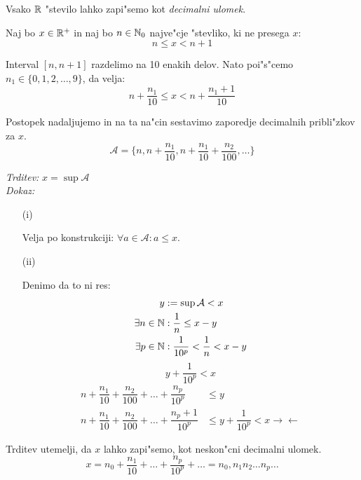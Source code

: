 Vsako $\mathbb{R}$ "stevilo lahko zapi"semo kot \emph{decimalni ulomek}.

Naj bo $x \in \mathbb{R}^+$ in naj bo $n \in \mathbb{N}_0$ najve"cje "stevliko, ki ne presega $x$:
\begin{equation*}
n \leq x < n + 1
\end{equation*}

Interval $[n, n+1]$ razdelimo na 10 enakih delov. Nato poi"s"cemo $n_1 \in \{0, 1, 2, \ldots, 9\}$, da velja:
\begin{equation*}
n + \frac{n_1}{10} \leq x <  n + \frac{n_1 + 1}{10}
\end{equation*}

Postopek nadaljujemo in na ta na"cin sestavimo zaporedje decimalnih pribli"zkov za $x$.
\begin{equation*}
\mathcal{A} = \{n, n + \frac{n_1}{10}, n + \frac{n_1}{10} + \frac{n_2}{100}, \ldots\}
\end{equation*}

\emph{Trditev:} $x = \sup \mathcal{A}$\\
\emph{Dokaz:}
\begin{enumerate}
	\item[(i)] 
	
	Velja po konstrukciji: $\forall a \in \mathcal{A}: a \leq x$.
	
	\item[(ii)] 
	
	Denimo da to ni res:
	\begin{align*}
	y &:= \sup \mathcal{A} < x\\
	\exists n \in \mathbb{N}&: \frac{1}{n} \leq x - y\\
	\exists p \in \mathbb{N}&: \frac{1}{10^p} < \dfrac{1}{n} < x - y
	\end{align*}
	\begin{equation*}
	y + \frac{1}{10^p} < x
	\end{equation*}
	\begin{align*}
		n + \dfrac{n_1}{10} + \dfrac{n_2}{100} + \ldots + \dfrac{n_p}{10^p} &\leq y\\
		n + \dfrac{n_1}{10} + \dfrac{n_2}{100} + \ldots + \dfrac{n_p+1}{10^p} &\leq y + \dfrac{1}{10^p} < x \rightarrow \leftarrow
	\end{align*}
\end{enumerate}
Trditev utemelji, da $x$ lahko zapi"semo, kot neskon"cni decimalni ulomek.
\begin{equation*}
x = n_0 + \dfrac{n_1}{10} + \ldots + \dfrac{n_p}{10^p} + \ldots = n_0,n_1n_2\ldots n_p\ldots
\end{equation*}

